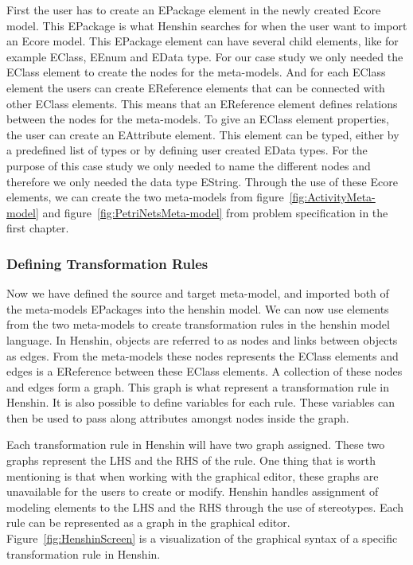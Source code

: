 First the user has to create an EPackage element in the newly created Ecore
model. This EPackage is what Henshin searches for when the user want to import
an Ecore model. This EPackage element can have several child elements, like for
example EClass, EEnum and EData type. For our case study we only needed the
EClass element to create the nodes for the meta-models. And for each EClass
element the users can create EReference elements that can be connected with
other EClass elements. This means that an EReference element defines relations
between the nodes for the meta-models. To give an EClass element properties, the
user can create an EAttribute element. This element can be typed, either by a
predefined list of types or by defining user created EData types. For the
purpose of this case study we only needed to name the different nodes and
therefore we only needed the data type EString. Through the use of these Ecore
elements, we can create the two meta-models from
figure~\ref{fig:ActivityMeta-model} and figure~\ref{fig:PetriNetsMeta-model} from
problem specification in the first chapter.


\subsubsection*{Defining Transformation Rules}

Now we have defined the source and target meta-model, and imported
both of the meta-models EPackages into the henshin model. We can now use elements
from the two meta-models to create transformation rules in the henshin model
language. In Henshin, objects are referred to as nodes and links between objects
as edges. From the meta-models these nodes represents the EClass elements and
edges is a EReference between these EClass elements. A collection of these nodes
and edges form a graph. This graph is what represent a transformation rule in
Henshin. It is also possible to define variables for each rule. These variables
can then be used to pass along attributes amongst nodes inside the
graph. 

Each transformation rule in Henshin will have two graph assigned.
These two graphs represent the LHS and the RHS of the rule. One thing that is worth mentioning is
that when working with the graphical editor, these graphs are unavailable for
the users to create or modify. Henshin handles assignment of modeling elements
to the LHS and the RHS through the use of stereotypes. Each rule can be
represented as a graph in the graphical editor. Figure~\ref{fig:HenshinScreen}
is a visualization of the graphical syntax of a specific transformation rule in
Henshin.

